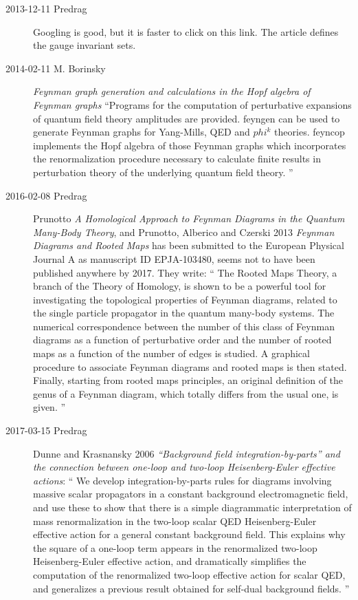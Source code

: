 \begin{description}
\item[2013-12-11  Predrag]
Googling is good, but it is faster to click on
{this link}. The article defines the gauge invariant sets.

\item[2014-02-11 M. Borinsky]
\emph{Feynman graph generation and calculations in the Hopf algebra of
Feynman graphs}
``Programs for the computation of perturbative expansions of quantum
field theory amplitudes are provided. feyngen can be used to generate
Feynman graphs for Yang-Mills, QED and $phi^k$ theories. feyncop
implements the Hopf algebra of those Feynman graphs which incorporates
the renormalization procedure necessary to calculate finite results in
perturbation theory of the underlying quantum field theory. ''

\item[2016-02-08  Predrag]
Prunotto
{\em A Homological Approach to Feynman Diagrams in the Quantum Many-Body Theory},
and
Prunotto, Alberico and Czerski 2013
{\em Feynman Diagrams and Rooted Maps}
has been submitted to the European Physical Journal A as manuscript ID EPJA-103480,
seems not to have been published anywhere by 2017.
They write: ``
The  Rooted Maps Theory, a branch of the Theory of Homology, is shown to be
a powerful tool for investigating  the topological properties of Feynman
diagrams, related to the single particle propagator in the quantum many-body
systems. The numerical correspondence between the number of this class of
Feynman diagrams as a function of perturbative order and the number of rooted
maps as a function of the number of edges is studied. A graphical procedure to
associate Feynman diagrams and rooted maps is then stated. Finally, starting
from rooted maps principles, an original definition of the genus of a
Feynman diagram, which totally differs from the usual one, is given.
''

\item[2017-03-15 Predrag]
Dunne and Krasnansky 2006 {\em ``Background field
integration-by-parts'' and the connection between one-loop and two-loop
{Heisenberg-Euler} effective actions}: ``
We develop integration-by-parts rules for diagrams involving massive
scalar propagators in a constant background electromagnetic field, and
use these to show that there is a simple diagrammatic interpretation of
mass renormalization in the two-loop scalar QED Heisenberg-Euler
effective action for a general constant background field. This explains
why the square of a one-loop term appears in the renormalized two-loop
Heisenberg-Euler effective action, and
dramatically simplifies the computation of the renormalized two-loop
effective action for scalar QED, and generalizes a previous result
obtained for self-dual background fields.
''


\end{description}
